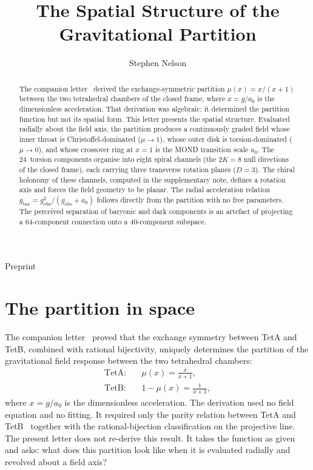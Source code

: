 \documentclass[twocolumn]{iopjournal}
\renewcommand{\articletype}[1]{%
  {\vspace*{-8mm}\noindent \Large \sf Preprint}\par
  \vspace*{6mm}\noindent{\scriptsize \sf{\bfseries \MakeUppercase{#1}}}}
\begin{document}
\articletype{Letter}

\title{The Spatial Structure of the Gravitational Partition}

\author{Stephen Nelson}



\begin{abstract}
The companion letter~\cite{Nelson2026b} derived the
exchange-symmetric partition $\mu(x) = x/(x{+}1)$ between the
two tetrahedral chambers of the closed frame, where
$x = g/a_0$ is the dimensionless acceleration.  That derivation
was algebraic: it determined the partition function but not its
spatial form.  This letter presents the spatial structure.
Evaluated radially about the field axis, the partition produces
a continuously graded field whose inner throat is
Christoffel-dominated ($\mu \to 1$), whose outer disk is
torsion-dominated ($\mu \to 0$), and whose crossover ring at
$x = 1$ is the MOND transition scale $a_0$.  The
24~torsion components organise into eight spiral channels
(the $2K = 8$ null directions of the closed frame), each
carrying three transverse rotation planes ($D = 3$).  The
chiral holonomy of these channels, computed in the
supplementary note, defines a rotation axis and forces the
field geometry to be planar.  The radial acceleration relation
$g_{\mathrm{bar}} = g_{\mathrm{obs}}^2/(g_{\mathrm{obs}} +
a_0)$ follows directly from the partition with no free
parameters.  The perceived separation of baryonic and dark
components is an artefact of projecting a 64-component
connection onto a 40-component subspace.
\end{abstract}


\section{The partition in space}

The companion letter~\cite{Nelson2026b} proved that the
exchange symmetry between TetA and TetB, combined with
rational bijectivity, uniquely determines the partition of
the gravitational field response between the two tetrahedral
chambers:
\begin{align}
  \text{TetA:} \quad & \mu(x) = \frac{x}{x + 1},
  \label{eq:mu} \\[4pt]
  \text{TetB:} \quad & 1 - \mu(x) = \frac{1}{x + 1},
  \label{eq:tetb}
\end{align}
where $x = g/a_0$ is the dimensionless acceleration.  The
derivation used no field equation and no fitting.  It required
only the parity relation between TetA and
TetB~\cite{Nelson2026a} together with the rational-bijection
classification on the projective line.  The present letter does
not re-derive this result.  It takes the function as given and
asks: what does this partition look like when it is evaluated
radially and revolved about a field axis?
\end{document}
